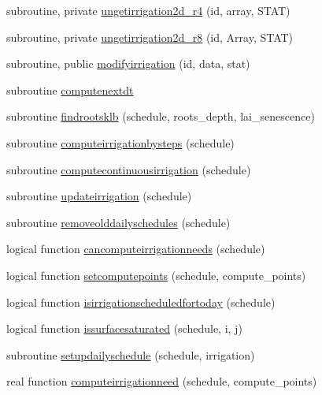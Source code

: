 \begin{DoxyCompactItemize}
\item 
subroutine, private \mbox{\hyperlink{namespacemoduleirrigation_a6f3edc54a431fcfb5b0676e0e83f9113}{ungetirrigation2d\+\_\+r4}} (id, array, S\+T\+AT)
\item 
subroutine, private \mbox{\hyperlink{namespacemoduleirrigation_a05ab21ff0a3d20f186805f3b6d100c9a}{ungetirrigation2d\+\_\+r8}} (id, Array, S\+T\+AT)
\item 
subroutine, public \mbox{\hyperlink{namespacemoduleirrigation_a1b4b8c33ee265298e1bf3cb4d19f6762}{modifyirrigation}} (id, data, stat)
\item 
subroutine \mbox{\hyperlink{namespacemoduleirrigation_adfeefc8d9f9d754a3a3c503b77e8b3e9}{computenextdt}}
\item 
subroutine \mbox{\hyperlink{namespacemoduleirrigation_a3bf1e9298115d3f00376f1288687113b}{findrootsklb}} (schedule, roots\+\_\+depth, lai\+\_\+senescence)
\item 
subroutine \mbox{\hyperlink{namespacemoduleirrigation_ad1bea8412119ae05c2eb3e177bcaed44}{computeirrigationbysteps}} (schedule)
\item 
subroutine \mbox{\hyperlink{namespacemoduleirrigation_a199776e3a4c64d2997f9a5b51681d1f6}{computecontinuousirrigation}} (schedule)
\item 
subroutine \mbox{\hyperlink{namespacemoduleirrigation_a5e72e31f9329f22de3b6ae1142d2371c}{updateirrigation}} (schedule)
\item 
subroutine \mbox{\hyperlink{namespacemoduleirrigation_a80324762e72192acef959aaff9c21571}{removeolddailyschedules}} (schedule)
\item 
logical function \mbox{\hyperlink{namespacemoduleirrigation_a4eb93ff5b528eade2a9dc76c368c8076}{cancomputeirrigationneeds}} (schedule)
\item 
logical function \mbox{\hyperlink{namespacemoduleirrigation_a3c849d3ae9b8a9b5488e452d7fb9490e}{setcomputepoints}} (schedule, compute\+\_\+points)
\item 
logical function \mbox{\hyperlink{namespacemoduleirrigation_aac246bcb2688c75d66da1daaa6234e3f}{isirrigationscheduledfortoday}} (schedule)
\item 
logical function \mbox{\hyperlink{namespacemoduleirrigation_aac6fd8245bfb3f2dff30adb8ac0e5d2d}{issurfacesaturated}} (schedule, i, j)
\item 
subroutine \mbox{\hyperlink{namespacemoduleirrigation_a056efe3e9f80f4703447f224848ebd47}{setupdailyschedule}} (schedule, irrigation)
\item 
real function \mbox{\hyperlink{namespacemoduleirrigation_ada3092907de79d715950bd53c82fd943}{computeirrigationneed}} (schedule, compute\+\_\+points)

\end{DoxyCompactItemize}
